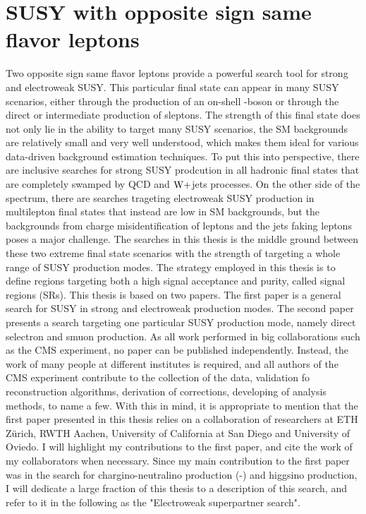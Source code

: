 \section{SUSY with opposite sign same flavor leptons}
\noindent\justify
Two opposite sign same flavor leptons provide a powerful search tool for strong and electroweak SUSY. 
This particular final state can appear in many SUSY scenarios, either through the production of an on-shell \PZ-boson or through the direct or intermediate production of sleptons. 
The strength of this final state does not only lie in the ability to target many SUSY scenarios, the SM backgrounds are relatively small and very well understood, which makes them ideal for various data-driven background estimation techniques. 
To put this into perspective, there are inclusive searches for strong SUSY prodcution in all hadronic final states that are completely swamped by QCD and $\mathrm{W}+$jets processes. 
On the other side of the spectrum, there are searches trageting electroweak SUSY production in multilepton final states that instead are low in SM backgrounds, but the backgrounds from charge misidentification of leptons and the jets faking leptons poses a major challenge. 
The searches in this thesis is the middle ground between these two extreme final state scenarios with the strength of targeting a whole range of SUSY production modes.   
The strategy employed in this thesis is to define regions targeting both a high signal acceptance and purity, called signal regions (SRs).
This thesis is based on two papers. 
The first paper \cite{Sirunyan:2017qaj} is a general search for SUSY in strong and electroweak production modes. 
The second paper \cite{Sirunyan:2018nwe} presents a search targeting one particular SUSY production mode, namely direct selectron and smuon production.  
As all work performed in big collaborations such as the CMS experiment, no paper can be published independently. 
Instead, the work of many people at different institutes is required, and all authors of the CMS experiment contribute to the collection of the data, validation fo reconstruction algorithms, derivation of corrections, developing of analysis methods, to name a few. 
With this in mind, it is appropriate to mention that the first paper presented in this thesis relies on a collaboration of researchers at ETH Z\"{u}rich, RWTH Aachen, University of California at San Diego and University of Oviedo. 
I will highlight my contributions to the first paper, and cite the work of my collaborators when necessary. 
Since my main contribution to the first paper was in the search for chargino-neutralino production (\firstcharg-\secondchi) and higgsino production, I will dedicate a large fraction of this thesis to a description of this search, and refer to it in the following as the "Electroweak superpartner search".
